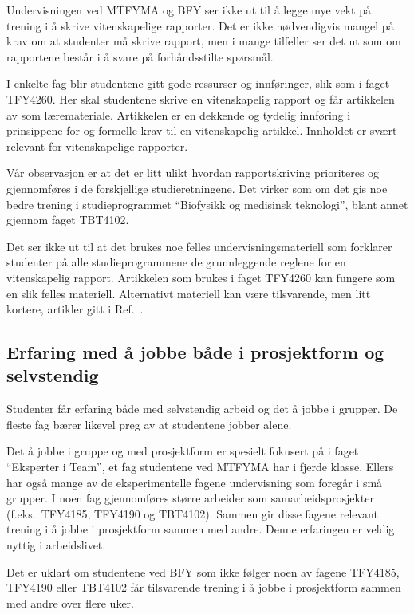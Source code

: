 \documentclass{article}
\begin{document}
Undervisningen ved MTFYMA og BFY ser ikke ut til å legge mye vekt på trening i å skrive vitenskapelige rapporter. Det er ikke nødvendigvis mangel på krav om at studenter må skrive rapport, men i mange tilfeller ser det ut som om rapportene består i å svare på forhåndsstilte spørsmål.

I enkelte fag blir studentene gitt gode ressurser og innføringer, slik som i faget TFY4260. Her skal studentene skrive en vitenskapelig rapport og får artikkelen av \citet{Ecarnot2015} som læremateriale. Artikkelen er en dekkende og tydelig innføring i prinsippene for og formelle krav til en vitenskapelig artikkel. Innholdet er svært relevant for vitenskapelige rapporter.

Vår observasjon er at det er litt ulikt hvordan rapportskriving prioriteres og gjennomføres i de forskjellige studieretningene. Det virker som om det gis noe bedre trening i studieprogrammet ``Biofysikk og medisinsk teknologi'', blant annet gjennom faget TBT4102.

Det ser ikke ut til at det brukes noe felles undervisningsmateriell som forklarer studenter på alle studieprogrammene de grunnleggende reglene for en vitenskapelig rapport. Artikkelen som brukes i faget TFY4260 kan fungere som en slik felles materiell. Alternativt materiell kan være tilsvarende, men litt kortere, artikler gitt i Ref.~\cite{Senturia2003}.




\subsection{Erfaring med å jobbe både i prosjektform og selvstendig}
Studenter får erfaring både med selvstendig arbeid og det å jobbe i grupper. De fleste fag bærer likevel preg av at studentene jobber alene.

Det å jobbe i gruppe og med prosjektform er spesielt fokusert på i faget ``Eksperter i Team'', et fag studentene ved MTFYMA har i fjerde klasse. Ellers har også mange av de eksperimentelle fagene undervisning som foregår i små grupper. I noen fag gjennomføres større arbeider som samarbeidsprosjekter (f.eks.~TFY4185, TFY4190 og TBT4102). Sammen gir disse fagene relevant trening i å jobbe i prosjektform sammen med andre. Denne erfaringen er veldig nyttig i arbeidslivet.

Det er uklart om studentene ved BFY som ikke følger noen av fagene TFY4185, TFY4190 eller TBT4102 får tilsvarende trening i å jobbe i prosjektform sammen med andre over flere uker.
\end{document}
